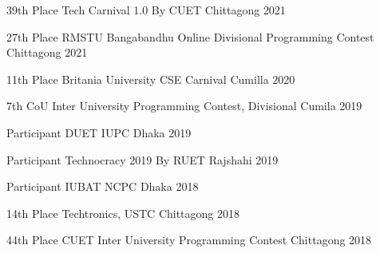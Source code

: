 



\begin{cvhonors}

  \cvhonor
    {39th Place} %
    {Tech Carnival 1.0 By CUET} %
    {Chittagong} %
    {2021} %

\cvhonor
    {27th Place} %
    {RMSTU Bangabandhu Online Divisional Programming Contest} %
    {Chittagong} %
    {2021} %

  \cvhonor
    {11th Place} %
    {Britania University CSE Carnival} %
    {Cumilla} %
    {2020} %

 \cvhonor
    {7th} %
    {CoU Inter University Programming Contest, Divisional} %
    {Cumila} %
    {2019} %

 \cvhonor
    {Participant} %
    {DUET IUPC} %
    {Dhaka} %
    {2019} %

\cvhonor
    {Participant} %
    {Technocracy 2019 By RUET} %
    {Rajshahi} %
    {2019} %

\cvhonor
    {Participant} %
    {IUBAT NCPC} %
    {Dhaka} %
    {2018} %

\cvhonor
    {14th Place} %
    {Techtronics, USTC} %
    {Chittagong} %
    {2018} %

\cvhonor
    {44th Place} %
    {CUET Inter University Programming Contest} %
    {Chittagong} %
    {2018} %

\end{cvhonors}


